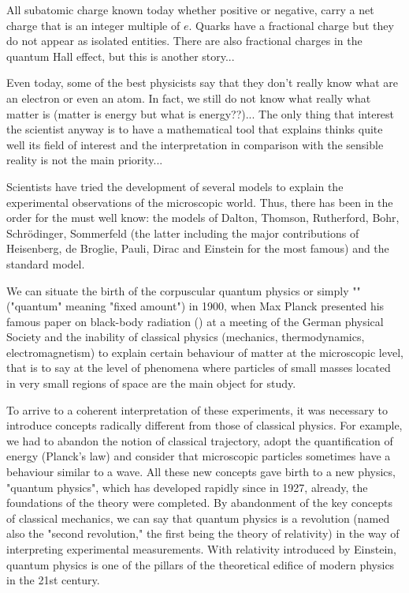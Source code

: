 	All subatomic charge known today whether positive or negative, carry a net charge that is an integer multiple of $e$. Quarks have a fractional charge but they do not appear as isolated entities. There are also fractional charges in the quantum Hall effect, but this is another story...

	Even today, some of the best physicists say that they don't really know what are an electron or even an atom. In fact, we still do not know what really what matter is (matter is energy but what is energy??)... The only thing that interest the scientist anyway is to have a mathematical tool that explains thinks quite well its field of interest and the interpretation in comparison with the sensible reality is not the main priority...

	Scientists have tried the development of several models to explain the experimental  observations of the microscopic world. Thus, there has been in the order for the must well know: the models of Dalton, Thomson, Rutherford, Bohr, Schrödinger, Sommerfeld (the latter including the major contributions of Heisenberg, de Broglie, Pauli, Dirac and Einstein for the most famous) and the standard model.

	We can situate the birth of the corpuscular quantum physics or simply "" ("quantum" meaning "fixed amount") in 1900, when Max Planck presented his famous paper on black-body radiation () at a meeting of the German physical Society and the inability of classical physics (mechanics, thermodynamics, electromagnetism) to explain certain behaviour of matter at the microscopic level, that is to say at the level of phenomena where particles of small masses located in very small regions of space are the main object for study.

	To arrive to a coherent interpretation of these experiments, it was necessary to introduce concepts radically different from those of classical physics. For example, we had to abandon the notion of classical trajectory, adopt the  quantification of energy (Planck's law) and consider that microscopic particles sometimes have a behaviour similar to a wave. All these new concepts gave birth to a new physics, "quantum physics", which has developed rapidly since  in 1927, already, the foundations of the theory were completed. By abandonment of the key concepts of classical mechanics, we can say that quantum physics is a revolution (named also the "second revolution," the first being the theory of relativity) in the way of interpreting experimental measurements. With relativity introduced by Einstein, quantum physics is one of the pillars of the theoretical edifice of modern physics in the 21st century.

